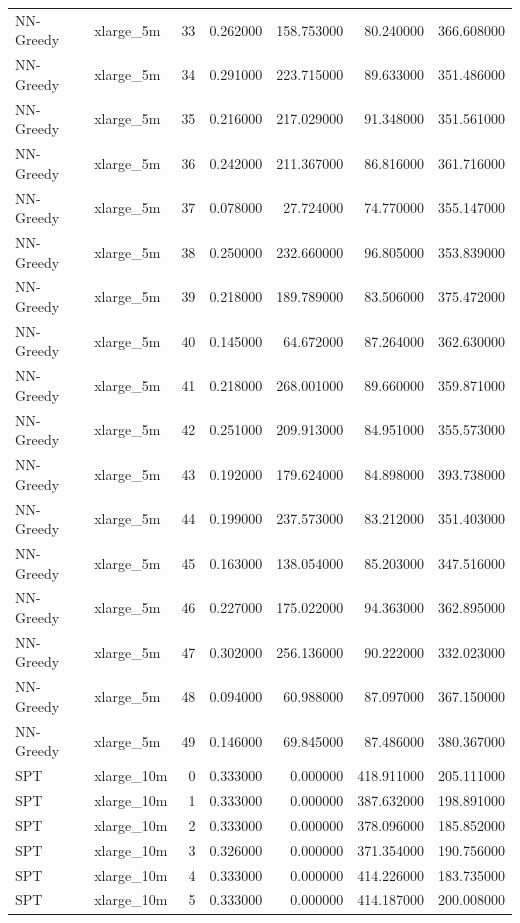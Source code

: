 \begin{tabular}{llrrrrr}
NN-Greedy & xlarge_5m & 33 & 0.262000 & 158.753000 & 80.240000 & 366.608000 \\
NN-Greedy & xlarge_5m & 34 & 0.291000 & 223.715000 & 89.633000 & 351.486000 \\
NN-Greedy & xlarge_5m & 35 & 0.216000 & 217.029000 & 91.348000 & 351.561000 \\
NN-Greedy & xlarge_5m & 36 & 0.242000 & 211.367000 & 86.816000 & 361.716000 \\
NN-Greedy & xlarge_5m & 37 & 0.078000 & 27.724000 & 74.770000 & 355.147000 \\
NN-Greedy & xlarge_5m & 38 & 0.250000 & 232.660000 & 96.805000 & 353.839000 \\
NN-Greedy & xlarge_5m & 39 & 0.218000 & 189.789000 & 83.506000 & 375.472000 \\
NN-Greedy & xlarge_5m & 40 & 0.145000 & 64.672000 & 87.264000 & 362.630000 \\
NN-Greedy & xlarge_5m & 41 & 0.218000 & 268.001000 & 89.660000 & 359.871000 \\
NN-Greedy & xlarge_5m & 42 & 0.251000 & 209.913000 & 84.951000 & 355.573000 \\
NN-Greedy & xlarge_5m & 43 & 0.192000 & 179.624000 & 84.898000 & 393.738000 \\
NN-Greedy & xlarge_5m & 44 & 0.199000 & 237.573000 & 83.212000 & 351.403000 \\
NN-Greedy & xlarge_5m & 45 & 0.163000 & 138.054000 & 85.203000 & 347.516000 \\
NN-Greedy & xlarge_5m & 46 & 0.227000 & 175.022000 & 94.363000 & 362.895000 \\
NN-Greedy & xlarge_5m & 47 & 0.302000 & 256.136000 & 90.222000 & 332.023000 \\
NN-Greedy & xlarge_5m & 48 & 0.094000 & 60.988000 & 87.097000 & 367.150000 \\
NN-Greedy & xlarge_5m & 49 & 0.146000 & 69.845000 & 87.486000 & 380.367000 \\
SPT & xlarge_10m & 0 & 0.333000 & 0.000000 & 418.911000 & 205.111000 \\
SPT & xlarge_10m & 1 & 0.333000 & 0.000000 & 387.632000 & 198.891000 \\
SPT & xlarge_10m & 2 & 0.333000 & 0.000000 & 378.096000 & 185.852000 \\
SPT & xlarge_10m & 3 & 0.326000 & 0.000000 & 371.354000 & 190.756000 \\
SPT & xlarge_10m & 4 & 0.333000 & 0.000000 & 414.226000 & 183.735000 \\
SPT & xlarge_10m & 5 & 0.333000 & 0.000000 & 414.187000 & 200.008000 \\

\end{tabular}

